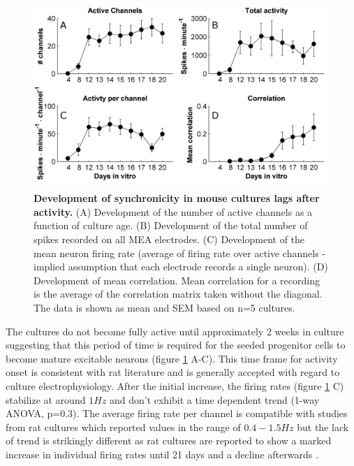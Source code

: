        \begin{figure}[!htb]
            \centering
            \includegraphics[width=15cm]{chapter3/figures/actMeasures/actMeasures.jpg}

            \caption[Averaged statistics of development of activity measures in mouse cultures]{\textbf{Development of synchronicity in mouse cultures lags after activity.} (A) Development of the number of active channels as a function of culture age. (B) Development of the total number of spikes recorded on all MEA electrodes. (C) Development of the mean neuron firing rate (average of firing rate over active channels - implied assumption that each electrode records a single neuron). (D) Development of mean correlation. Mean correlation for a recording is the average of the correlation matrix taken without the diagonal. The data is shown as mean and SEM based on n=5 cultures.}
            \label{fig:activity:actMeasures}
        \end{figure}

        The cultures do not become fully active until approximately 2 weeks in culture suggesting that this period of time is required for the seeded progenitor cells to become mature excitable neurons (figure \ref{fig:activity:actMeasures} A-C). This time frame for activity onset is consistent with rat literature \cite{van2004long,wagenaar2006extremely,chiappalone2006dissociated} and is generally accepted with regard to culture electrophysiology.  After the initial increase, the firing rates (figure \ref{fig:activity:actMeasures} C) stabilize at around \(1 Hz\) and don't exhibit a time dependent trend (1-way ANOVA, p=0.3). The average firing rate per channel is compatible with studies from rat cultures which reported values in the range of \(0.4-1.5 Hz\) \cite{chiappalone2006dissociated,van2004long,corner2002physiological,penn2016network} but the lack of trend is strikingly different as rat cultures are reported to show a marked increase in individual firing rates until 21 days and a decline afterwards \cite{chiappalone2006dissociated,bikbaev2015brain}.

